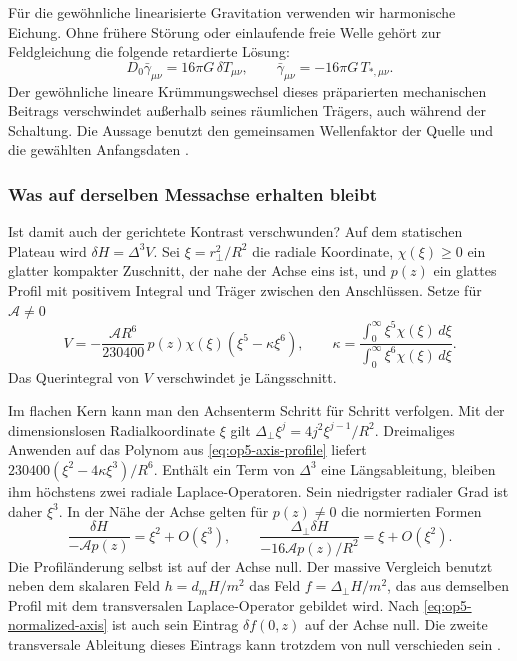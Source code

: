 Für die gewöhnliche linearisierte Gravitation verwenden wir harmonische Eichung. Ohne frühere Störung oder einlaufende freie Welle gehört zur Feldgleichung die folgende retardierte Lösung:
\begin{equation}
 D_0\bar\gamma_{\mu\nu}=16\pi G\,\delta T_{\mu\nu},
 \qquad \bar\gamma_{\mu\nu}=-16\pi G\,T_{*,\mu\nu} .
 \label{eq:op5-compact}
\end{equation}
Der gewöhnliche lineare Krümmungswechsel dieses präparierten mechanischen Beitrags verschwindet außerhalb seines räumlichen Trägers, auch während der Schaltung. Die Aussage benutzt den gemeinsamen Wellenfaktor der Quelle und die gewählten Anfangsdaten \cite{op5-motion}.

\subsubsection{Was auf derselben Messachse erhalten bleibt}

Ist damit auch der gerichtete Kontrast verschwunden? Auf dem statischen Plateau wird \(\delta H=\Delta^3 V\). Sei \(\xi=r_\perp^2/R^2\) die radiale Koordinate, \(\chi(\xi)\ge0\) ein glatter kompakter Zuschnitt, der nahe der Achse eins ist, und \(p(z)\) ein glattes Profil mit positivem Integral und Träger zwischen den Anschlüssen. Setze für \(\mathcal A\ne0\)
\begin{equation}
 V=-\frac{\mathcal A R^6}{230400}\,p(z)\chi(\xi)
       (\xi^5-\kappa\xi^6),\qquad
 \kappa=\frac{\int_0^\infty \xi^5\chi(\xi)\,d\xi}
              {\int_0^\infty \xi^6\chi(\xi)\,d\xi}.
 \label{eq:op5-axis-profile}
\end{equation}
Das Querintegral von \(V\) verschwindet je Längsschnitt.

Im flachen Kern kann man den Achsenterm Schritt für Schritt verfolgen. Mit der dimensionslosen Radialkoordinate \(\xi\) gilt \(\Delta_\perp \xi^j=4j^2\xi^{j-1}/R^2\). Dreimaliges Anwenden auf das Polynom aus \eqref{eq:op5-axis-profile} liefert \(230400(\xi^2-4\kappa\xi^3)/R^6\). Enthält ein Term von \(\Delta^3\) eine Längsableitung, bleiben ihm höchstens zwei radiale Laplace-Operatoren. Sein niedrigster radialer Grad ist daher \(\xi^3\). In der Nähe der Achse gelten für \(p(z)\ne0\) die normierten Formen
\begin{equation}
 \frac{\delta H}{-\mathcal A p(z)}=\xi^2+O(\xi^3),\qquad
 \frac{\Delta_\perp\delta H}{-16\mathcal A p(z)/R^2}=\xi+O(\xi^2).
 \label{eq:op5-normalized-axis}
\end{equation}
Die Profiländerung selbst ist auf der Achse null. Der massive Vergleich benutzt neben dem skalaren Feld \(h=d_mH/m^2\) das Feld \(f=\Delta_\perp H/m^2\), das aus demselben Profil mit dem transversalen Laplace-Operator gebildet wird. Nach \eqref{eq:op5-normalized-axis} ist auch sein Eintrag \(\delta f(0,z)\) auf der Achse null. Die zweite transversale Ableitung dieses Eintrags kann trotzdem von null verschieden sein \cite{op5-motion}.

